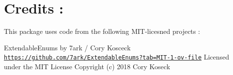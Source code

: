 \chapter{Credits :\+ }
\hypertarget{md__documentation_2_credits}{}\label{md__documentation_2_credits}
\label{md__documentation_2_credits_autotoc_md3}%
%


This package uses code from the following MIT-\/licesned projects :\+



Extendable\+Enums by 7ark /\+ Cory Kosceck \href{https://github.com/7ark/ExtendableEnums?tab=MIT-1-ov-file}{\texttt{https:\+/\+/\+github.\+com/\+7ark/\+\+Extendable\+Enums?tab=\+MIT-\/1-\/ov-\/file}} Licensed under the MIT License Copyright (c) 2018 Cory Koseck

 